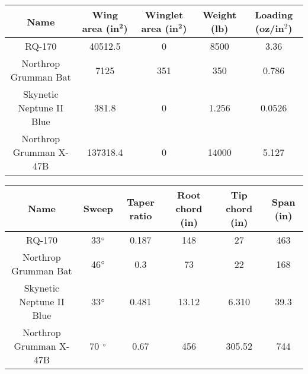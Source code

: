     \begin{table}[H]
        \begin{tabular}{|c|c|c|c|c|} %
            \hline \textbf{Name} & \textbf{Wing area (in$^\textbf{2}$)} & \textbf{Winglet area (in$^\textbf{2}$)} & \textbf{Weight (lb)} & \textbf{Loading (oz/in$^2$)} \\ \hline %
            RQ-170 & 40512.5 & 0 & 8500 & 3.36 \\ \hline
            Northrop Grumman Bat & 7125 & 351 & 350 & 0.786 \\ \hline
            Skynetic Neptune II Blue & 381.8 & 0 & 1.256 & 0.0526 \\ \hline
            Northrop Grumman X-47B & 137318.4 & 0 & 14000 & 5.127 \\ \hline
        \end{tabular}
    \end{table}
    
    \begin{table}[H]
        \begin{tabular}{|c|c|c|c|c|c| } %
            \hline \textbf{Name} & \textbf{Sweep} & \textbf{Taper ratio} & \textbf{Root chord (in)} & \textbf{Tip chord (in)} & \textbf{Span (in)} \\ \hline %
            RQ-170 & 33$\degree$ & 0.187 & 148 & 27 & 463 \\ \hline
            Northrop Grumman Bat & 46$ \degree$ & 0.3 & 73 & 22 & 168 \\ \hline
            Skynetic Neptune II Blue & 33$ \degree$ & 0.481 & 13.12 & 6.310 & 39.3 \\ \hline
            Northrop Grumman X-47B & 70 $\degree$ & 0.67 & 456 & 305.52 & 744\\ \hline
        \end{tabular}
    \end{table}
    
